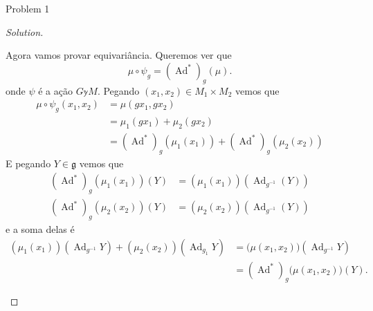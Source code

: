 \begin{thing1}{Problem 1}
\begin{proof}[Solution]
\begin{enumerate}[label=\alph*.]
Agora vamos provar equivariância. Queremos ver que
\[\mu \circ \psi_g=(\operatorname{Ad}^*)_g(\mu).\]
onde $\psi$ é a ação $G\mathbb{y}M$. Pegando $(x_1,x_2)\in M_1\times M_2$ vemos que
\begin{align*}
\mu \circ \psi_g(x_1,x_2)&= \mu(gx_1,gx_2)\\&=\mu_1(gx_1)+\mu_2(gx_2)\\&=(\operatorname{Ad}^*)_g(\mu_1(x_1))+(\operatorname{Ad}^*)_g(\mu_2(x_2))
\end{align*}
E pegando $Y\in \mathfrak{g}$ vemos que
\begin{align*}
	(\operatorname{Ad}^*)_g(\mu_1(x_1))(Y)&=(\mu_1(x_1))(\operatorname{Ad}_{g^{-1}}(Y))\\
	(\operatorname{Ad}^*)_g(\mu_2(x_2))(Y)&=(\mu_2(x_2))(\operatorname{Ad}_{g^{-1}}(Y))
\end{align*}
e a soma delas é
\begin{align*}
(\mu_1(x_1))(\operatorname{Ad}_{g^{-1}}Y)+(\mu_2(x_2))(\operatorname{Ad}_{g_1}Y)&=\Big(\mu(x_1,x_2)\Big)(\operatorname{Ad}_{g^{-1}}Y)\\
&=(\operatorname{Ad}^*)_g\Big(\mu(x_1,x_2)\Big)(Y).
\end{align*}



\end{enumerate}
\end{proof}
\end{thing1}
